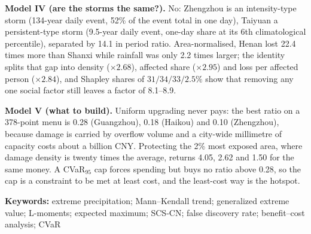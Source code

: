 \textbf{Model IV (are the storms the same?).} No: Zhengzhou is an intensity-type storm (134-year daily event, 52\% of the event total in one day), Taiyuan a persistent-type storm (9.5-year daily event, one-day share at its 6th climatological percentile), separated by 14.1 in period ratio. Area-normalised, Henan lost 22.4 times more than Shanxi while rainfall was only 2.2 times larger; the identity splits that gap into density ($\times2.68$), affected share ($\times2.95$) and loss per affected person ($\times2.84$), and Shapley shares of $31/34/33/2.5\%$ show that removing any one social factor still leaves a factor of 8.1--8.9.

\textbf{Model V (what to build).} Uniform upgrading never pays: the best ratio on a 378-point menu is 0.28 (Guangzhou), 0.18 (Haikou) and 0.10 (Zhengzhou), because damage is carried by overflow volume and a city-wide millimetre of capacity costs about a billion CNY. Protecting the 2\% most exposed area, where damage density is twenty times the average, returns 4.05, 2.62 and 1.50 for the same money. A CVaR$_{95}$ cap forces spending but buys no ratio above 0.28, so the cap is a constraint to be met at least cost, and the least-cost way is the hotspot.

\noindent\textbf{Keywords:} extreme precipitation; Mann--Kendall trend; generalized extreme value; L-moments; expected maximum; SCS-CN; false discovery rate; benefit--cost analysis; CVaR